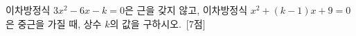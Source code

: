 이차방정식 $3x^2-6x-k=0$은 근을 갖지 않고, 이차방정식 $x^2+(k-1)x+9=0$은 중근을 가질 때, 상수 $k$의 값을 구하시오.~\mbox{\mbox{[7점]}}
